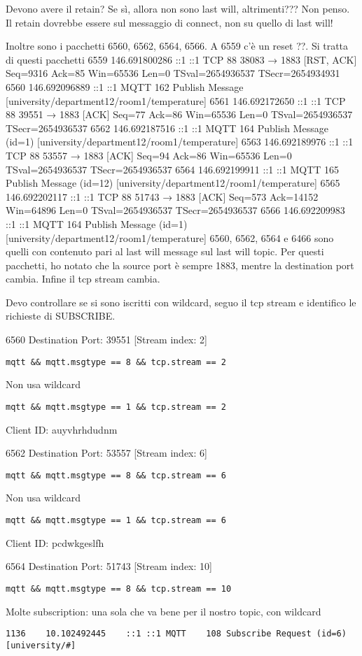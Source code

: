 Devono avere il retain? Se sì, allora non sono last will, altrimenti???
Non penso. Il retain dovrebbe essere sul messaggio di connect, non su quello di last will!

Inoltre sono i pacchetti 6560, 6562, 6564, 6566. A 6559 c'è un reset ??.
Si tratta di questi pacchetti 
6559	146.691800286	::1	::1	TCP	88	38083 → 1883 [RST, ACK] Seq=9316 Ack=85 Win=65536 Len=0 TSval=2654936537 TSecr=2654934931
6560	146.692096889	::1	::1	MQTT	162	Publish Message [university/department12/room1/temperature]
6561	146.692172650	::1	::1	TCP	88	39551 → 1883 [ACK] Seq=77 Ack=86 Win=65536 Len=0 TSval=2654936537 TSecr=2654936537
6562	146.692187516	::1	::1	MQTT	164	Publish Message (id=1) [university/department12/room1/temperature]
6563	146.692189976	::1	::1	TCP	88	53557 → 1883 [ACK] Seq=94 Ack=86 Win=65536 Len=0 TSval=2654936537 TSecr=2654936537
6564	146.692199911	::1	::1	MQTT	165	Publish Message (id=12) [university/department12/room1/temperature]
6565	146.692202117	::1	::1	TCP	88	51743 → 1883 [ACK] Seq=573 Ack=14152 Win=64896 Len=0 TSval=2654936537 TSecr=2654936537
6566	146.692209983	::1	::1	MQTT	164	Publish Message (id=1) [university/department12/room1/temperature]
6560, 6562, 6564 e 6466 sono quelli con contenuto pari al last will message sul last will topic.
Per questi pacchetti, ho notato che la source port è sempre 1883, mentre la destination port cambia.
Infine il tcp stream cambia.

Devo controllare se si sono iscritti con wildcard, seguo il tcp stream e identifico le richieste di SUBSCRIBE.

6560
Destination Port: 39551
[Stream index: 2]
\begin{verbatim}
mqtt && mqtt.msgtype == 8 && tcp.stream == 2
\end{verbatim}
Non usa wildcard
\begin{verbatim}
mqtt && mqtt.msgtype == 1 && tcp.stream == 2
\end{verbatim}
Client ID: auyvhrhdudnm

6562
Destination Port: 53557
[Stream index: 6]
\begin{verbatim}
mqtt && mqtt.msgtype == 8 && tcp.stream == 6
\end{verbatim}
Non usa wildcard
\begin{verbatim}
mqtt && mqtt.msgtype == 1 && tcp.stream == 6
\end{verbatim}
Client ID: pcdwkgeslfh

6564
Destination Port: 51743
[Stream index: 10]
\begin{verbatim}
mqtt && mqtt.msgtype == 8 && tcp.stream == 10
\end{verbatim}
Molte subscription: una sola che va bene per il nostro topic, con wildcard 
\begin{verbatim}
1136	10.102492445	::1	::1	MQTT	108	Subscribe Request (id=6) [university/#]
\end{verbatim}

